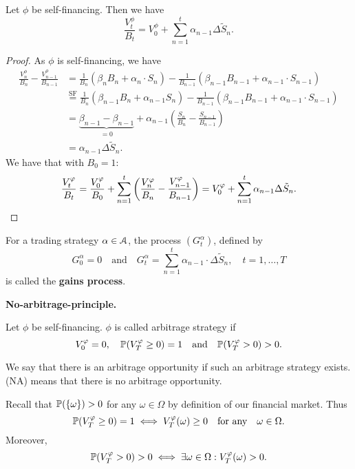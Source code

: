 \documentclass[12pt]{amsart}
\begin{document}
\begin{lemma}
    Let \(\phi\) be self-financing. Then we have \[
        \frac{V_t^\phi}{B_t} = V_0^\phi + \sum_{n=1}^t \alpha_{n-1} \Delta \tilde{S}_n.
    \]
\end{lemma}
\begin{proof}
    As \(\phi\) is self-financing, we have
    \begin{align*}
        \frac{V_n^\phi}{B_n} - \frac{V_{n-1}^\phi}{B_{n-1}}
        &= \frac{1}{B_n}\left( \beta_n B_n + \alpha_n \cdot S_n \right) - \frac{1}{B_{n-1}}\left( \beta_{n-1} B_{n-1} + \alpha_{n-1} \cdot S_{n-1} \right)\\
        &\stackrel{\text{SF}}{=} \frac{1}{B_n} \left( \beta_{n-1} B_n + \alpha_{n-1} S_n \right) - \frac{1}{B_{n-1}} \left( \beta_{n-1} B_{n-1} + \alpha_{n-1} \cdot S_{n-1} \right)\\
        &= \underbrace{\beta_{n-1}-\beta_{n-1}}_{=0} + \alpha_{n-1} \left( \frac{S_n}{B_n} - \frac{S_{n-1}}{B_{n-1}} \right)\\
        &= \alpha_{n-1} \Delta \tilde{S}_n.
    \end{align*}
    We have that with \(B_0 = 1\): \[
        \frac{V_t^\phi}{B_t} = \frac{V_0^\phi}{B_0} + \sum_{n=1}^t \left( \frac{V_n^\phi}{B_n} - \frac{V_{n-1}^\phi}{B_{n-1}} \right) = V_0^\phi + \sum_{n=1}^t \alpha_{n-1} \Delta \tilde{S}_n.\qedhere
    \]
\end{proof}

\begin{definition}
    For a trading strategy \(\alpha \in \cA\), the process \((G_t^\alpha)\), defined by \[
        G_0^\alpha = 0 \quad \text{and} \quad G_t^\alpha = \sum_{n=1}^t \alpha_{n-1}  \cdot \Delta \tilde{S}_n, \quad t=1, \dots, T
    \]
    is called the \textbf{gains process}.
\end{definition}

\textbf{No-arbitrage-principle.}

\begin{definition}
    Let \(\phi\) be self-financing. \(\phi\) is called arbitrage strategy if \[
        V_0^\phi = 0, \quad \P(V_T^\phi \geq 0) = 1 \quad \text{and}\quad \P(V_T^\phi > 0) > 0.
    \]
\end{definition}
\begin{remark}
    We say that there is an arbitrage opportunity if such an arbitrage strategy exists. (NA) means that there is no arbitrage opportunity.

    Recall that \(\P(\set{\omega}) > 0\) for any \(\omega \in \Omega\) by definition of our financial market. Thus \[
        \P(V_T^\phi \geq 0) = 1 \iff V_T^\phi(\omega) \geq 0 \quad \text{for any} \quad \omega \in \Omega.
    \]
    Moreover, \[
        \P(V_T^\phi > 0) > 0 \iff \exists \omega \in \Omega: V_T^\phi(\omega) > 0.
    \]
\end{remark}
\end{document}
